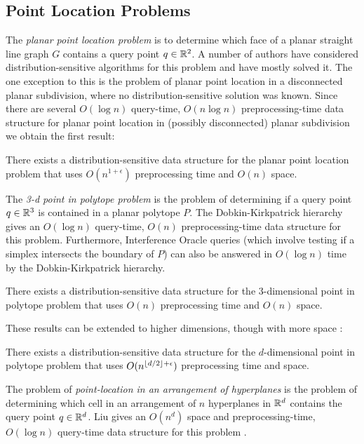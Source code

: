 \documentclass{patmorin}
\begin{document}
\subsection{Point Location Problems}

The \emph{planar point location problem} is to determine which face
of a planar straight line graph $G$ contains a query point $q\in\mathbb{R}^2$.
A number of authors have considered distribution-sensitive algorithms for
this problem \cite{acmr00,amm00,amm01a,amm01b,ammw07,cdilm08,i01,i04}
and have mostly solved it. The one exception to this is the problem
of planar point location in a disconnected planar subdivision, where
no distribution-sensitive solution was known.  Since there are several
$O(\log n)$ query-time, $O(n\log n)$ preprocessing-time data structure
for planar point location in (possibly disconnected) planar subdivision
\cite{k83,st86,egs86,m90,as98} we obtain the first result:

\begin{thm}
  There exists a distribution-sensitive data structure for the planar
  point location problem that uses $O(n^{1+\epsilon})$ preprocessing
  time and $O(n)$ space.
\end{thm}

The \emph{3-d point in polytope problem} is the problem of determining
if a query point $q\in\mathbb{R}^3$ is contained in a planar polytope $P$.
The Dobkin-Kirkpatrick hierarchy \cite{dk83} gives an $O(\log n)$ query-time,
$O(n)$ preprocessing-time data structure for this problem.  Furthermore,
Interference Oracle queries (which involve testing if a simplex intersects
the boundary of $P$) can also be answered in $O(\log n)$ time by the
Dobkin-Kirkpatrick hierarchy.

\begin{thm}
  There exists a distribution-sensitive data structure for the
  3-dimensional point in polytope problem that uses $O(n)$ preprocessing
  time and $O(n)$ space.
\end{thm}

These results can be extended to higher dimensions, though with more
space \cite{c88}:

\begin{thm}
  There exists a distribution-sensitive data structure for
  the $d$-dimensional point in polytope problem that uses
  $O(n^{{\left\lfloor d/2 \right\rfloor}+\epsilon})$ preprocessing time and space.
\end{thm}

The problem of \emph{point-location in an arrangement of hyperplanes} is
the problem of determining which cell in an arrangement of $n$ hyperplanes
in $\mathbb{R}^d$ contains the query point $q\in\mathbb{R}^d$.  Liu gives an $O(n^d)$
space and preprocessing-time, $O(\log n)$ query-time data structure for
this problem \cite{l04}.
\end{document}
